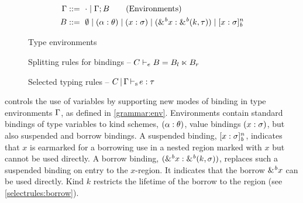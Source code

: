 \begin{figure}[tp]
  \begin{align*}
    \E &::=\ \Eempty \mid \E;B\tag{Environments}\\
    B &::=\ \bnone %
    \mid \bvar{\tvar}{\kschm} %
    \mid \bvar{x}{\schm}%
    \mid \bvar{\borrow{x}}{\borrowty{k}{\tau}}%
    \mid \svar{x}{\schm}^n %
  \end{align*}
  \vspace{-10pt}
  \caption{Type environments}
  \label{grammar:env}
  \vspace{5pt}
  \centering
    
    \vspace{-5pt}
    \caption{Splitting rules for bindings -- $C \vdash_e B = B_l \ltimes B_r$}
    \label{sdtyp:split}
  \vspace{-10pt}
\end{figure}


\begin{figure*}[tp]
    \vspace{-10pt}
    \caption{Selected typing rules -- $C \operatorname{|} \Gamma \operatorname{\vdash_s} e : \tau$}
    \label{selectrules:borrow}
    \label{selectrules:binders}
    \label{sdtyp:pair}
    \label{selectrules:region}
    \label{selectrules:matching}
    \vspace{-5pt}
\end{figure*}

\lang controls the use of variables by supporting new modes of
binding in type environments $\Gamma$, as defined in \cref{grammar:env}.
Environments contain standard bindings of type variables to kind schemes,
$(\alpha : \theta)$, value bindings $(x : \sigma)$, but also
suspended and borrow bindings.
A suspended binding, $[x : \sigma]_{\textit{b}}^n$, indicates that $x$ is
earmarked for a borrowing use in a nested region
marked with $x$ %
but
cannot be used directly.
A borrow binding, $({\&}^{\textit{b}}x : {\&}^{\textit{b}}(k,\sigma))$, replaces
such a suspended binding on entry to the $x$-region. It indicates
that the borrow ${\&}^{\textit{b}}x$ can be used directly. Kind $k$
restricts the lifetime of the borrow to the region (see \cref{selectrules:borrow}).

